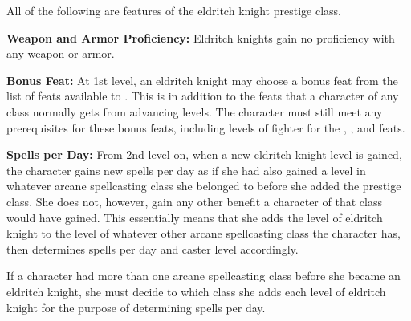\ClassFeatures

All of the following are features of the eldritch knight prestige class.

\textbf{Weapon and Armor Proficiency:} Eldritch knights gain no proficiency with 
any weapon or armor.

\textbf{Bonus Feat:} At 1st level, an eldritch knight may choose a bonus feat from 
the list of feats available to . This is in addition to the feats that 
a character of any class normally gets from advancing levels. The character must 
still meet any prerequisites for these bonus feats, including levels of fighter 
for the , , and  
feats.

\textbf{Spells per Day:} From 2nd level on, when a new eldritch knight level is 
gained, the character gains new spells per day as if she had also gained a level 
in whatever arcane spellcasting class she belonged to before she added the prestige 
class. She does not, however, gain any other benefit a character of that class 
would have gained. This essentially means that she adds the level of eldritch knight 
to the level of whatever other arcane spellcasting class the character has, then 
determines spells per day and caster level accordingly.

If a character had more than one arcane spellcasting class before she became an 
eldritch knight, she must decide to which class she adds each level of eldritch 
knight for the purpose of determining spells per day.
